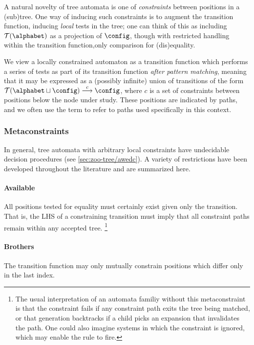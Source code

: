 A natural novelty of tree automata is one of {\em constraints} between
positions in a (sub)tree.  One way of inducing such constraints is to
augment the transition function, inducing {\em local} tests in the tree; one
can think of this as including $\mathcal{T}(\alphabet)$ as a projection of
$\config$, though with restricted handling within the transition
function,\eg only comparison for (dis)equality.

We view a locally constrained automaton as a transition function which
performs a series of tests as part of its transition function {\em after
pattern matching}, meaning that it may be expressed as a (possibly infinite)
union of transitions of the form $\mathcal{T}(\alphabet \sqcup \config)
\stackrel{c}{\longrightarrow} \config$, where $c$ is a set of constraints
between positions below the node under study.  These positions are indicated
by paths, and we often use the term  to refer to paths
used specifically in this context.

\subsubsection{Metaconstraints}

In general, tree automata with arbitrary local constraints have undecidable
decision procedures (see \autoref{sec:zoo-tree/awedc}).  A variety of
restrictions have been developed throughout the literature and are
summarized here.

\paragraph{Available} All positions tested for equality must certainly exist
given only the transition.  That is, the LHS of a constraining transition
must imply that all constraint paths remain within any accepted tree.%
%
\footnote{The usual interpretation of an automata familiy without this
metaconstraint is that the constraint fails if any constraint path exits the
tree being matched, or that generation backtracks if a child picks an
expansion that invalidates the path.  One could also imagine systems in
which the constraint is ignored, which may enable the rule to fire.}

\paragraph{Brothers} The transition function may only mutually constrain
positions which differ only in the last index.

